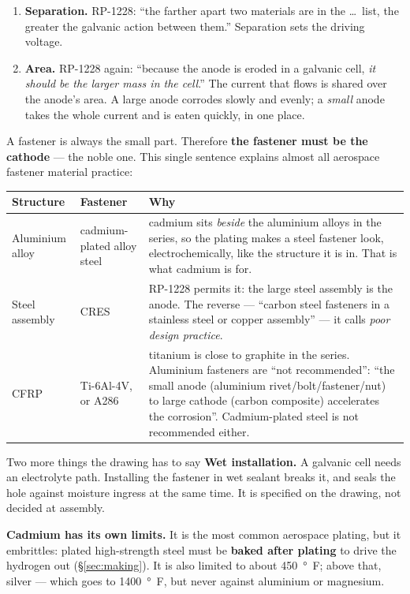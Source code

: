 \documentclass[11pt,a4paper]{article}
\begin{document}
\begin{enumerate}[leftmargin=*,itemsep=2pt]
\item \textbf{Separation.} RP-1228: ``the farther apart two materials are in the \dots\ list, the
  greater the galvanic action between them.'' Separation sets the driving voltage.
\item \textbf{Area.} RP-1228 again: ``because the anode is eroded in a galvanic cell, \emph{it
  should be the larger mass in the cell}.'' The current that flows is shared over the anode's area.
  A large anode corrodes slowly and evenly; a \emph{small} anode takes the whole current and is
  eaten quickly, in one place.
\end{enumerate}

\medskip
A fastener is always the small part. Therefore \textbf{the fastener must be the cathode} --- the
noble one. This single sentence explains almost all aerospace fastener material practice:

\begin{center}\footnotesize
\begin{tabular}{@{}p{3.3cm}p{3.6cm}p{7.0cm}@{}}
\toprule
Structure & Fastener & Why\\
\midrule
Aluminium alloy & cadmium-plated alloy steel & cadmium sits \emph{beside} the aluminium alloys in
  the series, so the plating makes a steel fastener look, electrochemically, like the structure it
  is in. That is what cadmium is for.\\[2pt]
Steel assembly & CRES & RP-1228 permits it: the large steel assembly is the anode. The reverse ---
  ``carbon steel fasteners in a stainless steel or copper assembly'' --- it calls \emph{poor design
  practice}.\\[2pt]
CFRP & Ti-6Al-4V, or A286 & titanium is close to graphite in the series. Aluminium fasteners are
  ``not recommended'': ``the small anode (aluminium rivet/bolt/fastener/nut) to large cathode
  (carbon composite) accelerates the corrosion''. Cadmium-plated steel is not recommended either.\\
\bottomrule
\end{tabular}
\end{center}

\begin{aerobox}{Two more things the drawing has to say}
\textbf{Wet installation.} A galvanic cell needs an electrolyte path. Installing the fastener in wet
sealant breaks it, and seals the hole against moisture ingress at the same time. It is specified on
the drawing, not decided at assembly.

\medskip
\textbf{Cadmium has its own limits.} It is the most common aerospace plating, but it embrittles:
plated high-strength steel must be \textbf{baked after plating} to drive the hydrogen out
(\S\ref{sec:making}). It is also limited to about \SI{450}{\degree F}; above that, silver --- which
goes to \SI{1400}{\degree F}, but never against aluminium or magnesium.
\end{aerobox}
\end{document}
